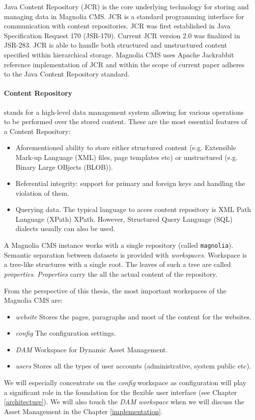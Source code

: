 Java Content Repository (JCR) is the core underlying technology for storing and
managing data in Magnolia CMS. JCR is a standard programming interface for
communication with content repositories. JCR was first established in Java
Specification Request 170 (JSR-170). Current JCR version 2.0 was finalized in
JSR-283. JCR is able to handle both structured and unstructured content
specified within hierarchical storage. Magnolia CMS uses Apache Jackrabbit
reference implementation of JCR and within the scope of current paper adheres to
the Java Content Repository standard.

\paragraph{Content Repository} stands for a high-level data management system
allowing for various operations to be performed over the stored content. These
are the most essential features of a Content Repository:

\begin{itemize}
  \item Aforementioned ability to store either structured content (e.g. Extensible Mark-up Language (XML)
  files, page templates etc) or unstructured (e.g. Binary Large OBjects (BLOB)).
  \item Referential integrity: support for primary and foreign keys and handling
  the violation of them.
  \item Querying data. The typical language to acces content repository is XML Path Language (XPath) \cite{xpath} 
  XPath. However, Structured Query Language (SQL) dialects usually can also be used.
\end{itemize}

A Magnolia CMS instance works with a single repository (called
\texttt{magnolia}). Semantic separation between datasets is provided with
\emph{workspaces}. Workspace is a tree-like structures with a single root.
The leaves of such a tree are called \emph{properties}. \emph{Properties} carry the all the
actual content of the repository.

From the perspective of this thesis, the most important workspaces of the Magnolia CMS are:
\begin{itemize}
  \item \emph{website} Stores the pages, paragraphs and most of the content  for the websites.
  \item \emph{config} The configuration settings.
  \item \emph{DAM} Workspace for Dynamic Asset Management.
  \item \emph{users} Stores all the types of user accounts (administrative, system public etc).
\end{itemize}

 We will especially concentrate on the \emph{config} workspace as configuration
 will play a significant role in the
foundation for the flexible user interface (see Chapter \ref{architecture}). We will
also touch the \emph{DAM workspace} when we will discuss the Asset Management in
the Chapter \ref{implementation}.
